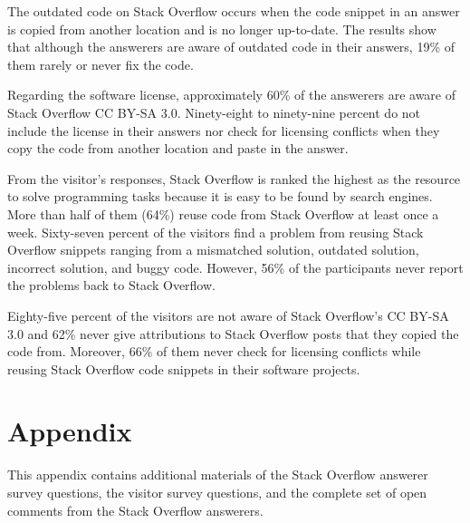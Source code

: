 \documentclass{svjour3}                     %
\begin{document}
The outdated code on Stack Overflow occurs when the code snippet in an answer is
copied from another location and is no longer up-to-date. The results show that
although the answerers are aware of outdated code in their answers, 19\% of them
rarely or never fix the code.

Regarding the software license, approximately 60\% of the answerers are aware of
Stack Overflow CC BY-SA 3.0. Ninety-eight to ninety-nine percent do not include
the license in their answers nor check for licensing conflicts when they copy
the code from another location and paste in the answer.

From the visitor's responses, Stack Overflow is ranked the highest as the
resource to solve programming tasks because it is easy to be found by search
engines. More than half of them (64\%) reuse code from Stack Overflow at least
once a week. Sixty-seven percent of the visitors find a problem from reusing
Stack Overflow snippets ranging from a mismatched solution, outdated solution,
incorrect solution, and buggy code. However, 56\% of the participants never
report the problems back to Stack Overflow.

Eighty-five percent of the visitors are not aware of Stack Overflow's CC BY-SA
3.0 and 62\% never give attributions to Stack Overflow posts that they copied
the code from. Moreover, 66\% of them never check for licensing conflicts while
reusing Stack Overflow code snippets in their software projects.


%
%

 

\clearpage
\section{Appendix}

This appendix contains additional materials of the Stack Overflow answerer survey questions, the visitor survey questions, and the complete set of open comments from the Stack Overflow answerers.

\clearpage

\appendix
\end{document}
